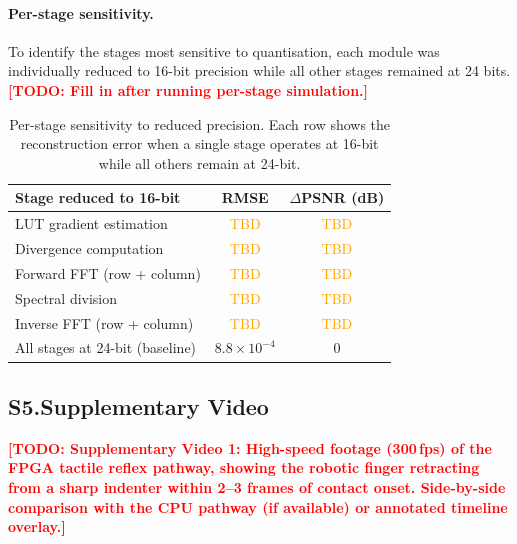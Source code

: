 \documentclass[10pt,a4paper]{article}
\newcommand{\todo}[1]{\textcolor{red}{\textbf{[TODO: #1]}}}
\newcommand{\placeholder}[1]{\textcolor{orange}{#1}}
\begin{document}
\paragraph{Per-stage sensitivity.}
To identify the stages most sensitive to quantisation, each module was individually reduced to 16-bit precision while all other stages remained at 24 bits. \todo{Fill in after running per-stage simulation.}

\begin{table}[h]
\centering
\caption{Per-stage sensitivity to reduced precision. Each row shows the reconstruction error when a single stage operates at 16-bit while all others remain at 24-bit.}
\label{tab:s_sensitivity}
\begin{tabular}{@{}lcc@{}}
\toprule
Stage reduced to 16-bit & RMSE & $\Delta$PSNR (dB) \\
\midrule
LUT gradient estimation & \placeholder{TBD} & \placeholder{TBD} \\
Divergence computation & \placeholder{TBD} & \placeholder{TBD} \\
Forward FFT (row + column) & \placeholder{TBD} & \placeholder{TBD} \\
Spectral division & \placeholder{TBD} & \placeholder{TBD} \\
Inverse FFT (row + column) & \placeholder{TBD} & \placeholder{TBD} \\
\midrule
All stages at 24-bit (baseline) & $8.8 \times 10^{-4}$ & 0 \\
\bottomrule
\end{tabular}
\end{table}


\subsection*{S5.\quad Supplementary Video}

\todo{Supplementary Video 1: High-speed footage (300\,fps) of the FPGA tactile reflex pathway, showing the robotic finger retracting from a sharp indenter within 2--3 frames of contact onset. Side-by-side comparison with the CPU pathway (if available) or annotated timeline overlay.}
\end{document}
